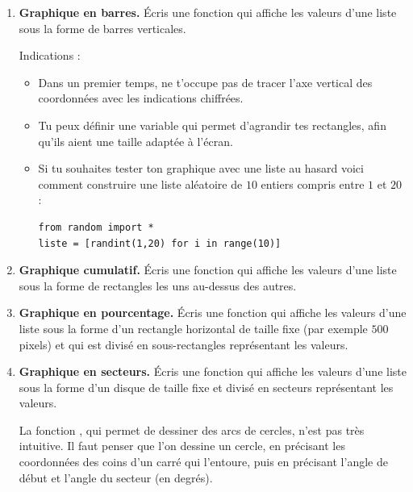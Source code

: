 \documentclass[11pt,class=report,crop=false]{standalone}
\begin{document}
\begin{activite}[Graphiques]
\begin{enumerate}
  \item \textbf{Graphique en barres.} Écris une fonction  qui affiche les valeurs d'une liste sous la forme de barres verticales.
  


 Indications :
  \begin{itemize}
    \item Dans un premier temps, ne t'occupe pas de tracer l'axe vertical des coordonnées avec les indications chiffrées.
    \item Tu peux définir une variable  qui permet d'agrandir tes rectangles, afin qu'ils aient une taille adaptée à l'écran.
    \item Si tu souhaites tester ton graphique avec une liste au hasard voici comment construire une liste aléatoire de $10$ entiers compris entre $1$ et $20$ :
    
\begin{lstlisting}
from random import *
liste = [randint(1,20) for i in range(10)]
\end{lstlisting}

\end{itemize}

  \item \textbf{Graphique cumulatif.} Écris une fonction  qui affiche les valeurs d'une liste sous la forme de rectangles les uns au-dessus des autres.
  

  
  \item \textbf{Graphique en pourcentage.} Écris une fonction  qui affiche les valeurs d'une liste sous la forme d'un rectangle horizontal de taille fixe (par exemple $500$ pixels) et qui est divisé en sous-rectangles représentant les valeurs.
  


  \item \textbf{Graphique en secteurs.} Écris une fonction  qui affiche les valeurs d'une liste sous la forme d'un disque de taille fixe et divisé en secteurs représentant les valeurs. 
 
La fonction , qui permet de dessiner des arcs de cercles, n'est pas très intuitive. Il faut penser que l'on dessine un cercle, en précisant les coordonnées des coins d'un carré qui l'entoure, puis en précisant l'angle de début et l'angle du secteur (en degrés). 


\end{enumerate}
\end{activite}
\end{document}
